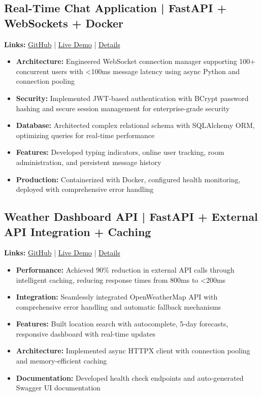 \documentclass[11pt,letterpaper]{article}
\newcommand{\resumeItem}[1]{\item\small{#1}}
\begin{document}
\subsection{Real-Time Chat Application | FastAPI + WebSockets + Docker}
\textbf{Links:} \href{https://github.com/segnimekonnen7}{GitHub} | \href{https://demo-link.com}{Live Demo} | \href{https://showcase-link.com}{Details}
\begin{itemize}[leftmargin=*]
    \resumeItem{\textbf{Architecture:} Engineered WebSocket connection manager supporting 100+ concurrent users with <100ms message latency using async Python and connection pooling}
    \resumeItem{\textbf{Security:} Implemented JWT-based authentication with BCrypt password hashing and secure session management for enterprise-grade security}
    \resumeItem{\textbf{Database:} Architected complex relational schema with SQLAlchemy ORM, optimizing queries for real-time performance}
    \resumeItem{\textbf{Features:} Developed typing indicators, online user tracking, room administration, and persistent message history}
    \resumeItem{\textbf{Production:} Containerized with Docker, configured health monitoring, deployed with comprehensive error handling}
\end{itemize}

\subsection{Weather Dashboard API | FastAPI + External API Integration + Caching}
\textbf{Links:} \href{https://github.com/segnimekonnen7}{GitHub} | \href{https://demo-link.com}{Live Demo} | \href{https://showcase-link.com}{Details}
\begin{itemize}[leftmargin=*]
    \resumeItem{\textbf{Performance:} Achieved 90\% reduction in external API calls through intelligent caching, reducing response times from 800ms to <200ms}
    \resumeItem{\textbf{Integration:} Seamlessly integrated OpenWeatherMap API with comprehensive error handling and automatic fallback mechanisms}
    \resumeItem{\textbf{Features:} Built location search with autocomplete, 5-day forecasts, responsive dashboard with real-time updates}
    \resumeItem{\textbf{Architecture:} Implemented async HTTPX client with connection pooling and memory-efficient caching}
    \resumeItem{\textbf{Documentation:} Developed health check endpoints and auto-generated Swagger UI documentation}
\end{itemize}
\end{document}
